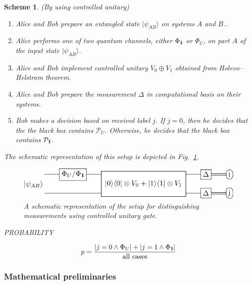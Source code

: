 \documentclass[preprint,12pt, a4paper]{elsarticle}
\newcommand{\ket}[1]{\ensuremath{|#1\rangle}}
\newcommand{\1}{{\rm 1\hspace{-0.9mm}l}}
\newcommand{\Id}{{\rm 1\hspace{-0.9mm}l}}
\newcommand{\PP}{\mathcal{P}}
\newtheorem{scheme}{Scheme}
\begin{document}
\begin{scheme}(By using controlled unitary)
	


\begin{enumerate}
\item Alice and Bob prepare an entangled state $\ket{\psi_{AB}}$ on 
systems $A$ and $B$..
\item Alice performs one of two quantum channels, either $\Phi_{\Id}$ or
$\Phi_{U}$,  on part $A$ of the input state  $\ket{\psi_{AB}}$.
\item Alice and Bob implement controlled unitary $V_0 \oplus V_1$ obtained from 
Holevo--Helstrom theorem.	
\item Alice and Bob prepare the measurement $\Delta$ in computational basis on 
their systems.
\item Bob makes a decision based on received label $j$. If $j=0$, then he
decides that the the black box contains $\PP_U$. Otherwise, he decides that the
black box contains $\PP_{\Id}$.
\end{enumerate}

The schematic representation of this setup is depicted in 
Fig.~\ref{fig:controlled}.     
\begin{figure}[h!]
	\centering 
	\includegraphics[scale=1.5]{pics/controlled_unitary} 
	
	\caption{ A schematic representation of the setup for distinguishing
		measurements using controlled unitary gate. 
	}\label{fig:controlled}
\end{figure} 


PROBABILITY 

\begin{equation}
p = \frac{|j=0 \wedge \Phi_{U} | + |j=1 \wedge \Phi_{\1}|}{\text{all 
		cases}}
\end{equation}

\end{scheme}




\subsubsection{Mathematical preliminaries}
\end{document}
